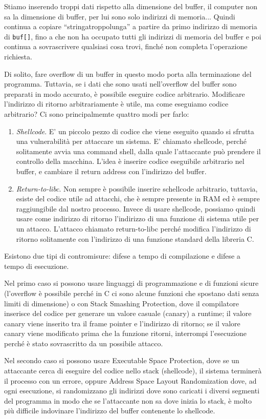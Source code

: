 Stiamo inserendo troppi dati rispetto alla dimensione del buffer, il computer non sa la dimensione di buffer, per lui sono solo indirizzi di memoria... Quindi continua a copiare “stringatroppolunga” a partire da primo indirizzo di memoria di \verb|buf[]|, fino a che non ha occupato tutti gli indirizzi di memoria del buffer e poi continua a sovrascrivere qualsiasi cosa trovi, finché non completa l'operazione richiesta.

Di solito, fare overflow di un buffer in questo modo porta alla terminazione del programma. Tuttavia, se i dati che sono usati nell'overflow del buffer sono preparati in modo accurato, è possibile eseguire codice arbitrario. Modificare l'indirizzo di ritorno arbitrariamente è utile, ma come eseguiamo codice arbitrario? Ci sono principalmemte quattro modi per farlo: 
\begin{enumerate}
    \item \textit{Shellcode}. E' un piccolo pezzo di codice che viene eseguito quando si sfrutta una vulnerabilità per attaccare un sistema. E' chiamato shellcode, perché solitamente avvia una command shell, dalla quale l'attaccante può prendere il controllo della macchina. L'idea è inserire codice eseguibile arbitrario nel buffer, e cambiare il return address con l'indirizzo del buffer.

    \item \textit{Return-to-libc}. Non sempre è possibile inserire schellcode arbitrario, tuttavia, esiste del codice utile ad attacchi, che è sempre presente in RAM ed è sempre raggiungibile dal nostro processo. Invece di usare shellcode, possiamo quindi usare come indirizzo di ritorno l'indirizzo di una funzione di sistema utile per un attacco. L'attacco chiamato return-to-libc perché modifica l'indirizzo di ritorno solitamente con l'indirizzo di una funzione standard della libreria C.
\end{enumerate}

Esistono due tipi di contromisure: difese a tempo di compilazione e difese a tempo di esecuzione.

Nel primo caso si possono usare linguaggi di programmazione e di funzioni sicure (l'overflow è possibile perché in C ci sono alcune funzioni che spostano dati senza limiti di dimensione) o con Stack Smashing Protection, dove il compilatore inserisce del codice per generare un valore casuale (canary) a runtime; il valore canary viene inserito tra il frame pointer e l'indirizzo di ritorno; se il valore canary viene modificato prima che la funzione ritorni, interrompi l'esecuzione perché è stato sovrascritto da un possibile attacco.

Nel secondo caso si possono usare Executable Space Protection, dove se un attaccante cerca di eseguire del codice nello stack (shellcode), il sistema terminerà il processo con un errore, oppure Address Space Layout Randomization dove, ad ogni esecuzione, si randomizzano gli indirizzi dove sono caricati i diversi segmenti del programma in modo che se l'attaccante non sa dove inizia lo stack, è molto più difficile indovinare l’indirizzo del buffer contenente lo shellcode.